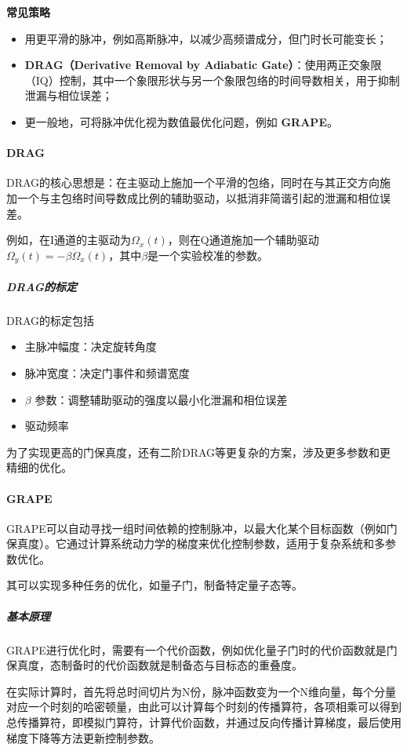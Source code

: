 \documentclass[12pt,a4paper,oneside]{ctexbook}
\let\oldparagraph\paragraph
\renewcommand{\paragraph}[1]{\oldparagraph{#1}\mbox{}}
\let\oldsubparagraph\subparagraph
\renewcommand{\subparagraph}[1]{\oldsubparagraph{#1}\mbox{}}
\begin{document}
\noindent\textbf{常见策略}

\begin{itemize}
  \item 用更平滑的脉冲，例如高斯脉冲，以减少高频谱成分，但门时长可能变长；
  \item \textbf{DRAG（Derivative Removal by Adiabatic Gate）}：使用两正交象限（IQ）控制，其中一个象限形状与另一个象限包络的时间导数相关，用于抑制泄漏与相位误差；
  \item 更一般地，可将脉冲优化视为数值最优化问题，例如 \textbf{GRAPE}。
\end{itemize}

\paragraph{DRAG}
DRAG的核心思想是：在主驱动上施加一个平滑的包络，同时在与其正交方向施加一个与主包络时间导数成比例的辅助驱动，以抵消非简谐引起的泄漏和相位误差。
\par 例如，在I通道的主驱动为$\Omega_x(t)$，则在Q通道施加一个辅助驱动$\Omega_y(t) = -\beta \dot{\Omega}_x(t)$，其中$\beta$是一个实验校准的参数。
\subparagraph{DRAG的标定}

DRAG的标定包括
\begin{itemize}
  \item 主脉冲幅度：决定旋转角度
  \item 脉冲宽度：决定门事件和频谱宽度
  \item $\beta$ 参数：调整辅助驱动的强度以最小化泄漏和相位误差
  \item 驱动频率
\end{itemize}

为了实现更高的门保真度，还有二阶DRAG等更复杂的方案，涉及更多参数和更精细的优化。

\paragraph{GRAPE}
GRAPE可以自动寻找一组时间依赖的控制脉冲，以最大化某个目标函数（例如门保真度）。它通过计算系统动力学的梯度来优化控制参数，适用于复杂系统和多参数优化。

其可以实现多种任务的优化，如量子门，制备特定量子态等。

\subparagraph{基本原理}

GRAPE进行优化时，需要有一个代价函数，例如优化量子门时的代价函数就是门保真度，态制备时的代价函数就是制备态与目标态的重叠度。

在实际计算时，首先将总时间切片为N份，脉冲函数变为一个N维向量，每个分量对应一个时刻的哈密顿量，由此可以计算每个时刻的传播算符，各项相乘可以得到总传播算符，即模拟门算符，计算代价函数，并通过反向传播计算梯度，最后使用梯度下降等方法更新控制参数。
\end{document}
